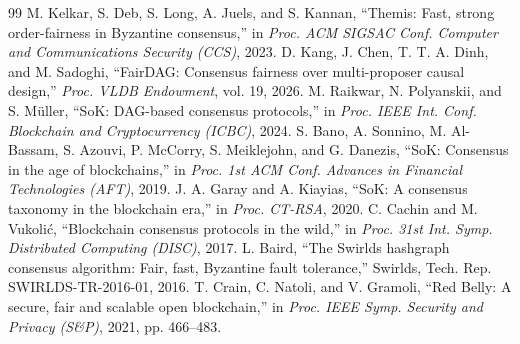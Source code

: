 \documentclass[UTF8,fontset=windows,a4paper,11pt]{ctexart}
\begin{document}
\begin{thebibliography}{99}
 M. Kelkar, S. Deb, S. Long, A. Juels, and S. Kannan, “Themis: Fast, strong order-fairness in Byzantine consensus,” in \textit{Proc. ACM SIGSAC Conf. Computer and Communications Security (CCS)}, 2023.
 D. Kang, J. Chen, T. T. A. Dinh, and M. Sadoghi, “FairDAG: Consensus fairness over multi-proposer causal design,” \textit{Proc. VLDB Endowment}, vol. 19, 2026.
 M. Raikwar, N. Polyanskii, and S. Müller, “SoK: DAG-based consensus protocols,” in \textit{Proc. IEEE Int. Conf. Blockchain and Cryptocurrency (ICBC)}, 2024.
 S. Bano, A. Sonnino, M. Al-Bassam, S. Azouvi, P. McCorry, S. Meiklejohn, and G. Danezis, “SoK: Consensus in the age of blockchains,” in \textit{Proc. 1st ACM Conf. Advances in Financial Technologies (AFT)}, 2019.
 J. A. Garay and A. Kiayias, “SoK: A consensus taxonomy in the blockchain era,” in \textit{Proc. CT-RSA}, 2020.
 C. Cachin and M. Vukolić, “Blockchain consensus protocols in the wild,” in \textit{Proc. 31st Int. Symp. Distributed Computing (DISC)}, 2017.
 L. Baird, “The Swirlds hashgraph consensus algorithm: Fair, fast, Byzantine fault tolerance,” Swirlds, Tech. Rep. SWIRLDS-TR-2016-01, 2016.
 T. Crain, C. Natoli, and V. Gramoli, “Red Belly: A secure, fair and scalable open blockchain,” in \textit{Proc. IEEE Symp. Security and Privacy (S\&P)}, 2021, pp. 466–483.
\end{thebibliography}
\end{document}

